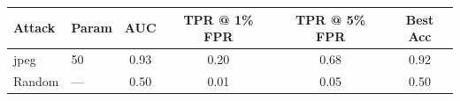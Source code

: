 \begin{tabular}{llcccc}
\toprule
Attack & Param & AUC & TPR @ 1\% FPR & TPR @ 5\% FPR & Best Acc \\
\midrule
jpeg & 50 & 0.93 & 0.20 & 0.68 & 0.92 \\
Random & — & 0.50 & 0.01 & 0.05 & 0.50 \\
\bottomrule
\end{tabular}

